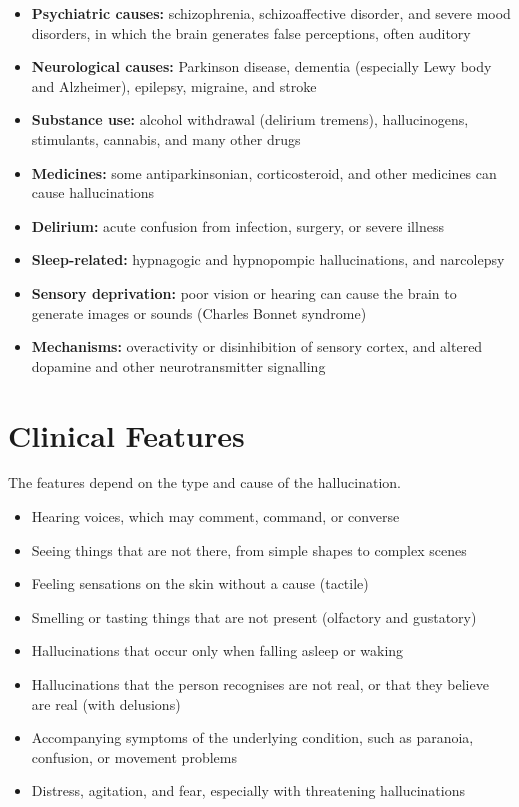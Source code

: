 \begin{itemize}
    \item \textbf{Psychiatric causes:} schizophrenia, schizoaffective disorder, and severe mood disorders, in which the brain generates false perceptions, often auditory
    \item \textbf{Neurological causes:} Parkinson disease, dementia (especially Lewy body and Alzheimer), epilepsy, migraine, and stroke
    \item \textbf{Substance use:} alcohol withdrawal (delirium tremens), hallucinogens, stimulants, cannabis, and many other drugs
    \item \textbf{Medicines:} some antiparkinsonian, corticosteroid, and other medicines can cause hallucinations
    \item \textbf{Delirium:} acute confusion from infection, surgery, or severe illness
    \item \textbf{Sleep-related:} hypnagogic and hypnopompic hallucinations, and narcolepsy
    \item \textbf{Sensory deprivation:} poor vision or hearing can cause the brain to generate images or sounds (Charles Bonnet syndrome)
    \item \textbf{Mechanisms:} overactivity or disinhibition of sensory cortex, and altered dopamine and other neurotransmitter signalling
\end{itemize}

\section*{Clinical Features}
The features depend on the type and cause of the hallucination.

\begin{itemize}
    \item Hearing voices, which may comment, command, or converse
    \item Seeing things that are not there, from simple shapes to complex scenes
    \item Feeling sensations on the skin without a cause (tactile)
    \item Smelling or tasting things that are not present (olfactory and gustatory)
    \item Hallucinations that occur only when falling asleep or waking
    \item Hallucinations that the person recognises are not real, or that they believe are real (with delusions)
    \item Accompanying symptoms of the underlying condition, such as paranoia, confusion, or movement problems
    \item Distress, agitation, and fear, especially with threatening hallucinations
\end{itemize}

